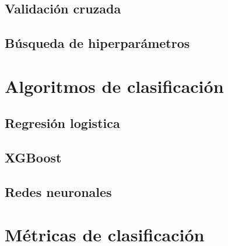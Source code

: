 \subsection{Validación cruzada}

\subsection{Búsqueda de hiperparámetros}

\section{Algoritmos de clasificación}

\subsection{Regresión logistica}

\subsection{XGBoost}

\subsection{Redes neuronales}

\section{Métricas de clasificación}